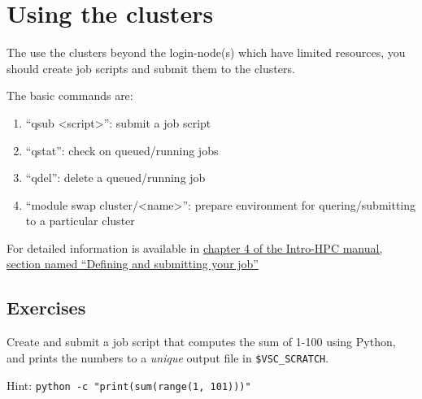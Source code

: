 \chapter{Using the clusters}

The use the clusters beyond the \gls{login-node}(s) which have limited resources, you
should create job scripts and submit them to the clusters.

The basic commands are:

\begin{enumerate}
 \item``qsub <script>'': submit a job script
 \item``qstat'': check on queued/running jobs
 \item``qdel'': delete a queued/running job
 \item``module swap cluster/<name>'': prepare environment for quering/submitting to a particular cluster
\end{enumerate}

For detailed information is available in
\href{\HPCManualURL#sec:defining-and-submitting-job}{chapter 4 of the Intro-HPC manual, section named ``Defining and submitting your job''}

\section{Exercises}

Create and submit a job script that computes the sum of 1-100 using Python, and
prints the numbers to a \emph{unique} output file in \lstinline|$VSC_SCRATCH|.

Hint: \lstinline|python -c "print(sum(range(1, 101)))"|
